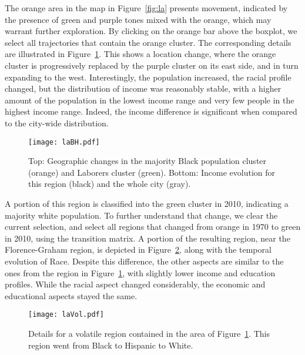 
The orange area in the map in Figure~\ref{fig:la} presents movement, indicated by
the presence of green and purple tones mixed with the orange, which may warrant
further exploration. By clicking on the orange bar above the boxplot, we select
all trajectories that contain the orange cluster. The corresponding details are
illustrated in Figure~\ref{fig:labh}. This shows a location change, where the
orange cluster is progressively replaced by the purple cluster on its east side,
and in turn expanding to the west. Interestingly, the population increased, the
racial profile changed, but the distribution of income was reasonably stable,
with a higher amount of the population in the lowest income range and very few
people in the highest income range. Indeed, the income  difference is
significant when compared to the city-wide distribution.

\begin{figure}
    \centering 
    \texttt{[image: laBH.pdf]}
    \caption{Top: Geographic changes in the majority Black population cluster
    (orange) and Laborers cluster (green). Bottom: Income evolution for this
    region (black) and the whole city (gray).\label{fig:labh}}
\end{figure}


A portion of this region is classified into the green cluster in 2010,
indicating a majority white population. To further understand that change, we
clear the current selection, and select all regions that changed from orange in
1970 to green in 2010, using the transition matrix. A portion of the resulting
region, near the Florence-Graham region, is depicted in Figure~\ref{fig:laVol},
along with the temporal evolution of Race. Despite this difference, the other
aspects are similar to the ones from the region in Figure~\ref{fig:labh}, with
slightly lower income and education profiles. While the racial aspect changed
considerably, the economic and educational aspects stayed the same.

\begin{figure}
    \centering 
    \texttt{[image: laVol.pdf]}
    \caption{Details for a volatile region contained in the area of
         Figure~\ref{fig:labh}. This region went from Black to Hispanic to
        White.\label{fig:laVol}}
\end{figure}


